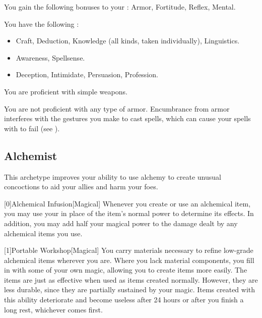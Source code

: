         You gain the following bonuses to your :  Armor,  Fortitude,  Reflex,  Mental.

        You have the following :
        \begin{itemize}
            \item {} Craft, Deduction, Knowledge (all kinds, taken individually), Linguistics.
            \item {} Awareness, Spellsense.
            \item {} Deception, Intimidate, Persuasion, Profession.
        \end{itemize}

        You are proficient with simple weapons.

        You are not proficient with any type of armor.
        Encumbrance from armor interferes with the gestures you make to cast spells, which can cause your spells with  to fail (see ).

    \newpage
    \subsection{Alchemist}
        This archetype improves your ability to use alchemy to create unusual concoctions to aid your allies and harm your foes.

        [0]{Alchemical Infusion}[Magical] Whenever you create or use an alchemical item, you may use your   in place of the item's normal power to determine its effects.
        In addition, you may add half your magical power to the damage dealt by any alchemical items you use.

        [1]{Portable Workshop}[Magical]
        You carry materials necessary to refine low-grade alchemical items wherever you are.
        Where you lack material components, you fill in with some of your own magic, allowing you to create items more easily.
        The items are just as effective when used as items created normally.
        However, they are less durable, since they are partially sustained by your magic.
        Items created with this ability deteriorate and become useless after 24 hours or after you finish a long rest, whichever comes first.

